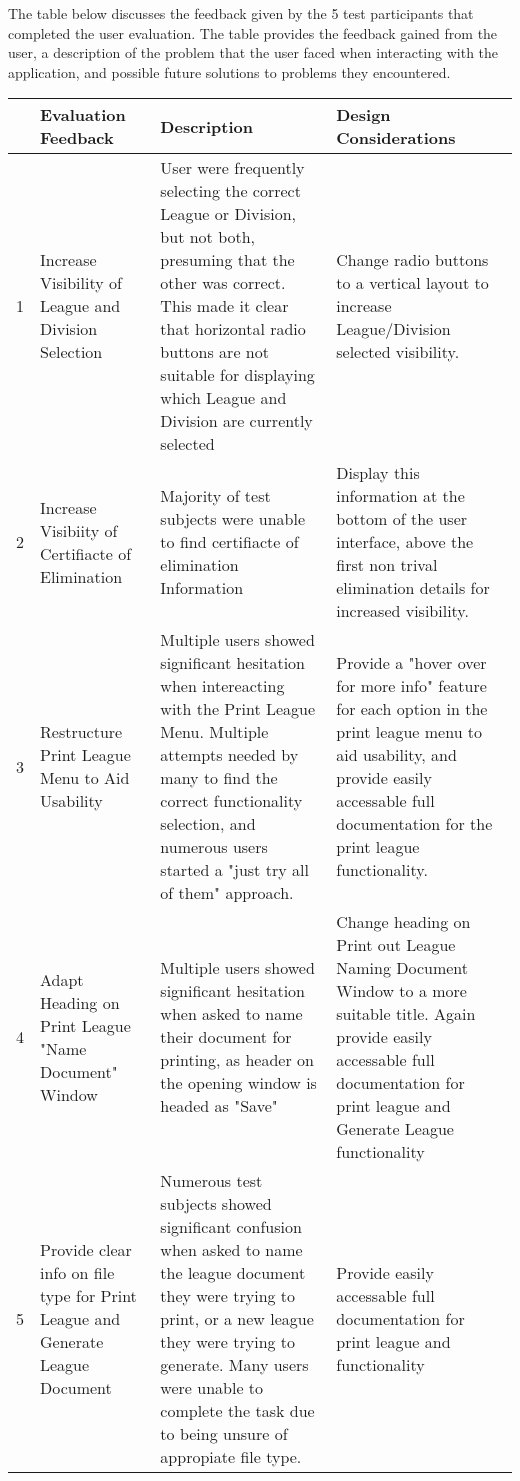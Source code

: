 The table below discusses the feedback given by the 5 test participants that completed the user evaluation. The table provides the feedback gained from the user, a description of the problem that the user faced when interacting with the application, and possible future solutions to problems they encountered. 


\begin{table}[t]

\begin{tabular}{|l|p{3cm}|p{5cm}|p{4cm}|}
\hline
 & Evaluation Feedback & Description & Design Considerations  \\
\hline
1 & Increase Visibility of League and Division Selection & User were frequently selecting the correct League or Division, but not both, presuming that the other was correct. This made it clear that horizontal radio buttons are not suitable for displaying which  League and Division are currently selected   & Change radio buttons to a vertical layout to increase League/Division selected visibility.     \\
\hline
2 & Increase Visibiity of Certifiacte of Elimination & Majority of test subjects were unable to find certifiacte of elimination Information   & Display this information at the bottom of the user interface, above the first non trival elimination details for increased visibility.     \\
\hline
3 & Restructure Print League Menu to Aid Usability & Multiple users showed significant hesitation when intereacting with the Print League Menu. Multiple attempts needed by many to find the correct functionality selection, and numerous users started a "just try all of them" approach. & Provide a "hover over for more info" feature for each option in the print league menu to aid usability, and provide easily accessable full documentation for the print league functionality.   \\
\hline
4 & Adapt Heading on Print League "Name Document" Window &Multiple users showed significant hesitation when asked to name their document for printing, as header on the opening window is headed as "Save"  & Change heading on Print out League Naming Document Window to a more suitable title. Again provide easily accessable full documentation for print league and Generate League functionality    \\
\hline
5 & Provide clear info on file type for Print League and Generate League Document     & Numerous test subjects showed significant confusion when asked to name the league document they were trying to print, or a new league they were trying to generate. Many users were unable to complete the task due to being unsure of appropiate file type.  & Provide easily accessable full documentation for print league and functionality   \\

\end{tabular}
\end{table}
